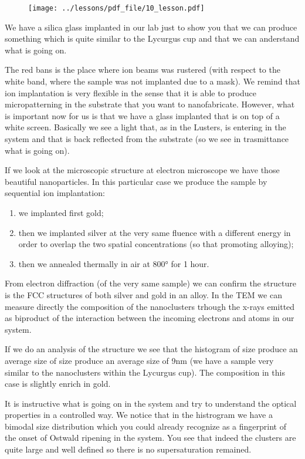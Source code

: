 \documentclass[../main/main.tex]{subfiles}
\begin{document}
\begin{figure}[h!]
\centering
\texttt{[image: ../lessons/pdf\_file/10\_lesson.pdf]}
\end{figure}

We have a silica glass implanted in our lab just to show you that we can produce something which is quite similar to the Lycurgus cup and that we can anderstand what is going on.

The red bans is the place where ion beams was rustered (with respect to the white band, where the sample was not implanted due to a mask). We remind that ion implantation is very flexible in the sense that it is able to produce micropatterning in the substrate that you want to nanofabricate.
However, what is important now for us is that we have a glass implanted that is on top of a white screen. Basically we see a light that, as in the Lusters, is entering in the system and that is back reflected from the substrate (so we see in trasmittance what is going on).

If we look at the microscopic structure at electron microscope  we have those beautiful nanoparticles. In this particular case we produce the sample by sequential ion implantation:
\begin{enumerate}
\item we implanted first gold;
\item then we implanted silver at the very same fluence with a different energy in order to overlap the two spatial concentrations (so that promoting alloying);
\item then we annealed thermally in air at 800° for 1 hour.
\end{enumerate}
From electron diffraction (of the very same sample) we can confirm the structure is the FCC structures of both silver and gold in an alloy. In the TEM we can measure directly the composition of the nanoclusters trhough the x-rays emitted as biproduct of the interaction between the incoming electrons and atoms in our system.

If we do an analysis of the structure we see that the histogram of size produce an average size of size produce an average size of 9nm (we have a sample very similar to the nanoclusters within the Lycurgus cup). The composition in this case is slightly enrich in gold.

It is instructive what is going on in the system and try to understand the optical properties in a controlled way.
We notice that in the histrogram we have a bimodal size distribution which you could already recognize as a fingerprint of the onset of Ostwald ripening in the system. You see that indeed the clusters are quite large and well defined so there is no supersaturation remained.
\end{document}
